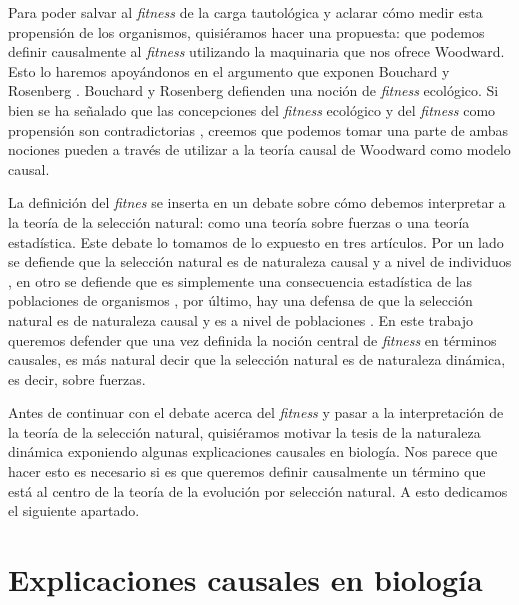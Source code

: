 Para poder salvar al \emph{fitness} de la carga tautológica
y aclarar cómo medir esta propensión de los organismos, quisiéramos hacer una propuesta: que podemos definir causalmente al
\emph{fitness} utilizando la maquinaria que nos ofrece Woodward. Esto lo haremos apoyándonos en el argumento que exponen Bouchard
y Rosenberg \cite{Bouchard2004}. Bouchard y Rosenberg defienden una noción de \emph{fitness} ecológico. Si bien se ha señalado que
las concepciones del \emph{fitness} ecológico y del \emph{fitness} como propensión son contradictorias \cite{sep-fitness}, creemos
que podemos tomar una parte de ambas nociones pueden a través de utilizar a la teoría causal de Woodward como modelo causal.

La definición del \emph{fitnes} se inserta en un debate sobre cómo debemos interpretar a la teoría de la selección natural: como una teoría sobre fuerzas o una teoría estadística. Este debate lo tomamos de lo expuesto en tres artículos. Por un lado se defiende que la selección natural es de naturaleza causal y a nivel de individuos \cite{Bouchard2004}, en otro se defiende que es simplemente una consecuencia estadística de las poblaciones de organismos \cite{Walsh2002}, por último, hay una defensa de que la selección natural es de naturaleza causal y es a nivel de poblaciones \cite{Millstein2006}. En este trabajo queremos defender que una vez definida la noción central de \emph{fitness} en términos causales, es más natural decir que la selección natural es de naturaleza dinámica, es decir, sobre fuerzas.

Antes de continuar con el debate acerca del \emph{fitness} y pasar a la interpretación de la teoría de la selección natural, quisiéramos motivar la tesis de la naturaleza dinámica exponiendo algunas explicaciones causales en biología. Nos parece que hacer esto es necesario si es que queremos definir causalmente un término que está al centro de la teoría de la evolución por selección natural. A esto dedicamos el siguiente apartado.

\section{Explicaciones causales en biología}

